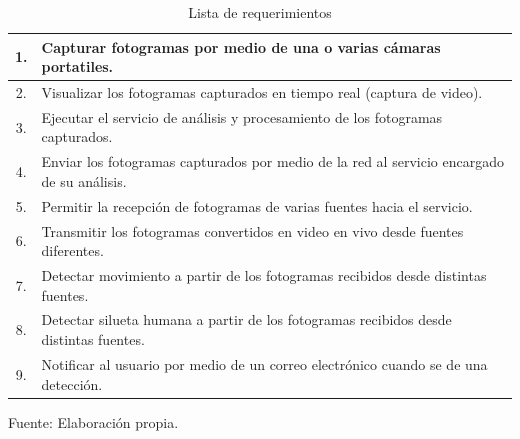 \begin{table}[H]
    \caption{Lista de requerimientos}
    \label{tabla:ejemplo}
    \begin{center}
        \begin{tabular}{ |c|l|} 
            \hline
            1. & Capturar fotogramas por medio de una o varias cámaras portatiles.\\ \hline
            2. & Visualizar los fotogramas capturados en tiempo real (captura de video).\\  \hline
            3. & Ejecutar el servicio de análisis y procesamiento de los fotogramas capturados.\\  \hline
            4. & Enviar los fotogramas capturados por medio de la red al servicio encargado de su análisis.\\ \hline
            5. & Permitir la recepción de fotogramas de varias fuentes hacia el servicio.\\ \hline
            6. & Transmitir los fotogramas convertidos en video en vivo desde fuentes diferentes.\\ \hline
            7. & Detectar movimiento a partir de los fotogramas recibidos desde distintas fuentes.\\ \hline
            8. & Detectar silueta humana a partir de los fotogramas recibidos desde distintas fuentes.\\ \hline
            9. & Notificar al usuario por medio de un correo electrónico cuando se de una detección.\\ \hline
        \end{tabular}
    \end{center}
    \begin{center}
        Fuente: Elaboración propia.
    \end{center}
\end{table}

